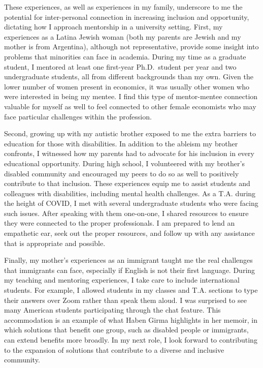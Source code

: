 These experiences, as well as experiences in my family, underscore to me the potential for inter-personal connection in increasing inclusion and opportunity, dictating how I approach mentorship in a university setting. First, my experiences as a Latina Jewish woman (both my parents are Jewish and my mother is from Argentina), although not representative, provide some insight into problems that minorities can face in academia. During my time as a graduate student, I mentored at least one first-year Ph.D.\ student per year and two undergraduate students, all from different backgrounds than my own. Given the lower number of women present in economics, it was usually other women who were interested in being my mentee. I find this type of mentor-mentee connection valuable for myself as well to feel connected to other female economists who may face particular challenges within the profession. 

Second, growing up with my autistic brother exposed to me the extra barriers to education for those with disabilities. In addition to the ableism my brother confronts, I witnessed how my parents had to advocate for his inclusion in every educational opportunity. During high school, I volunteered with my brother's disabled community and encouraged my peers to do so as well to positively contribute to that inclusion. These experiences equip me to assist students and colleagues with disabilities, including mental health challenges. As a T.A. during the height of COVID, I met with several undergraduate students who were facing such issues. After speaking with them one-on-one, I shared resources to ensure they were connected to the proper professionals. I am prepared to lend an empathetic ear, seek out the proper resources, and follow up with any assistance that is appropriate and possible. 

Finally, my mother's experiences as an immigrant taught me the real challenges that immigrants can face, especially if English is not their first language.  During my teaching and mentoring experiences, I take care to include international students. For example, I allowed students in my classes and T.A. sections to type their answers over Zoom rather than speak them aloud. I was surprised to see many American students participating through the chat feature. This accommodation is an example of what Haben Girma highlights in her memoir, in which solutions that benefit one group, such as disabled people or immigrants, can extend benefits more broadly. In my next role, I look forward to contributing to the expansion of solutions that contribute to a diverse and inclusive community. 




